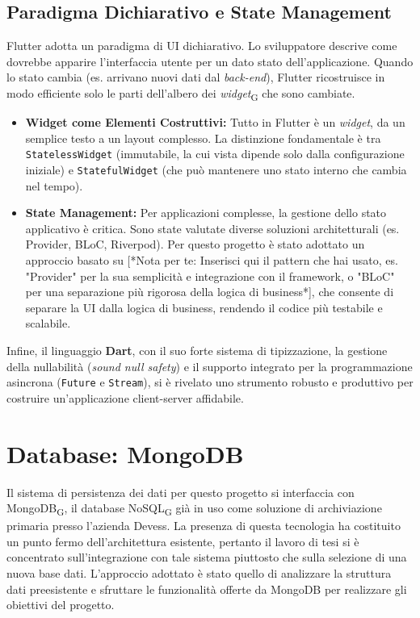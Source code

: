 \subsection{Paradigma Dichiarativo e State Management}
Flutter adotta un paradigma di UI dichiarativo. Lo sviluppatore descrive come dovrebbe apparire l'interfaccia utente per un dato stato dell'applicazione. Quando lo stato cambia (es. arrivano nuovi dati dal \textit{back-end}), Flutter ricostruisce in modo efficiente solo le parti dell'albero dei \textit{widget}\textsubscript{G} che sono cambiate.
\begin{itemize}
    \item \textbf{Widget come Elementi Costruttivi:} Tutto in Flutter è un \textit{widget}, da un semplice testo a un layout complesso. La distinzione fondamentale è tra \texttt{StatelessWidget} (immutabile, la cui vista dipende solo dalla configurazione iniziale) e \texttt{StatefulWidget} (che può mantenere uno stato interno che cambia nel tempo).
    \item \textbf{State Management:} Per applicazioni complesse, la gestione dello stato applicativo è critica. Sono state valutate diverse soluzioni architetturali (es. Provider, BLoC, Riverpod). Per questo progetto è stato adottato un approccio basato su [*Nota per te: Inserisci qui il pattern che hai usato, es. "Provider" per la sua semplicità e integrazione con il framework, o "BLoC" per una separazione più rigorosa della logica di business*], che consente di separare la UI dalla logica di business, rendendo il codice più testabile e scalabile.
\end{itemize}
Infine, il linguaggio \textbf{Dart}, con il suo forte sistema di tipizzazione, la gestione della nullabilità (\textit{sound null safety}) e il supporto integrato per la programmazione asincrona (\texttt{Future} e \texttt{Stream}), si è rivelato uno strumento robusto e produttivo per costruire un'applicazione client-server affidabile.

\section{Database: MongoDB}
\label{sec:database}
Il sistema di persistenza dei dati per questo progetto si interfaccia con MongoDB\textsubscript{G}, il database NoSQL\textsubscript{G} già in uso come soluzione di archiviazione primaria presso l'azienda Devess. La presenza di questa tecnologia ha costituito un punto fermo dell'architettura esistente, pertanto il lavoro di tesi si è concentrato sull'integrazione con tale sistema piuttosto che sulla selezione di una nuova base dati. L'approccio adottato è stato quello di analizzare la struttura dati preesistente e sfruttare le funzionalità offerte da MongoDB per realizzare gli obiettivi del progetto.

